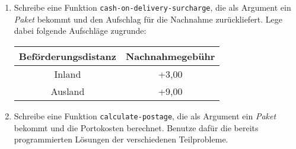 \begin{aufgabe}
\begin{enumerate}
  \item Schreibe eine Funktion
    \lstinline{cash-on-delivery-surcharge}, die als Argument ein
    \textit{Paket} bekommt und den Aufschlag für die Nachnahme
    zurückliefert.  Lege dabei folgende Aufschläge zugrunde:

    \begin{center}
      \begin{tabular}{c|c}
        Beförderungsdistanz & Nachnahmegebühr \\
        \hline
        Inland & +3,00 \\
        Ausland & +9,00 \\
      \end{tabular}
    \end{center}

  \item Schreibe eine Funktion \lstinline{calculate-postage}, die
    als Argument ein \textit{Paket} bekommt und die Portokosten
    berechnet.  Benutze dafür die bereits programmierten
    Lösungen der verschiedenen Teilprobleme.
    
  \end{enumerate}
  
\end{aufgabe}

